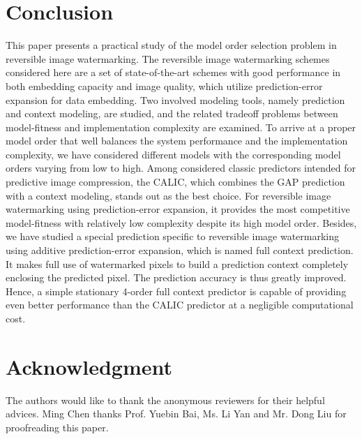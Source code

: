 \documentclass[journal]{IEEEtran}
\begin{document}
\section{Conclusion}\label{sec:conclution}

This paper presents a practical study of the model order selection problem in reversible image
watermarking. The reversible image watermarking schemes considered here are a set of
state-of-the-art schemes with good performance in both embedding capacity and image quality,
which utilize prediction-error expansion for data embedding. Two involved modeling tools, namely
prediction and context modeling, are studied, and the related tradeoff problems between
model-fitness and implementation complexity are examined. To arrive at a proper model order that
well balances the system performance and the implementation complexity, we have considered different
models with the corresponding model orders varying from low to high. Among considered classic
predictors intended for predictive image compression, the CALIC, which combines the GAP prediction
with a context modeling, stands out as the best choice. For reversible image watermarking using
prediction-error expansion, it provides the most competitive model-fitness with relatively low
complexity despite its high model order. Besides, we have studied a special prediction specific to
reversible image watermarking using additive prediction-error expansion, which is named full context
prediction. It makes full use of watermarked pixels to build a prediction context completely
enclosing the predicted pixel. The prediction accuracy is thus greatly improved. Hence, a simple
stationary 4-order full context predictor is capable of providing even better performance than the
CALIC predictor at a negligible computational cost. 

\section*{Acknowledgment}
The authors would like to thank the anonymous reviewers for their helpful advices. Ming Chen thanks
Prof. Yuebin Bai, Ms. Li Yan and Mr. Dong Liu for proofreading this paper.
\end{document}
